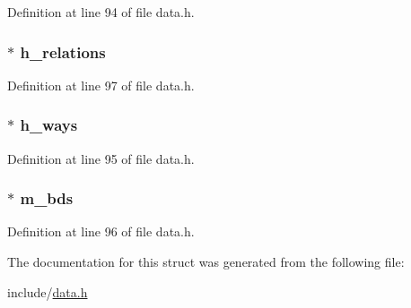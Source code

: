 Definition at line 94 of file data.\+h.

\subsubsection[{\texorpdfstring{h\+\_\+relations}{h_relations}}]{$\ast$ h\+\_\+relations}\hypertarget{struct_map_abc1f65a8dd87d50c657bea6a0b157f56}{}\label{struct_map_abc1f65a8dd87d50c657bea6a0b157f56}


Definition at line 97 of file data.\+h.

\subsubsection[{\texorpdfstring{h\+\_\+ways}{h_ways}}]{$\ast$ h\+\_\+ways}\hypertarget{struct_map_a255d568bce680d722841b9343f6cc90a}{}\label{struct_map_a255d568bce680d722841b9343f6cc90a}


Definition at line 95 of file data.\+h.

\subsubsection[{\texorpdfstring{m\+\_\+bds}{m_bds}}]{$\ast$ m\+\_\+bds}\hypertarget{struct_map_afe75a6a865f0b33f04695c4134b4b37d}{}\label{struct_map_afe75a6a865f0b33f04695c4134b4b37d}


Definition at line 96 of file data.\+h.



The documentation for this struct was generated from the following file\+:\begin{DoxyCompactItemize}
\item 
include/\hyperlink{data_8h}{data.\+h}\end{DoxyCompactItemize}
